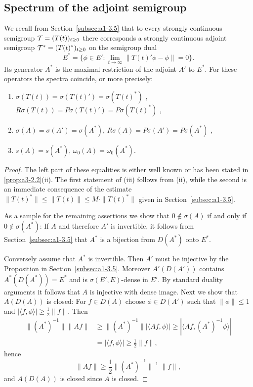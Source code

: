 \subsection{Spectrum of the adjoint semigroup}\label{subsec:a3-4.4}%
We recall from Section~\ref{subsec:a1-3.5} that to every strongly continuous semigroup $\TT = (T(t))_{t \geq 0}$ there corresponds a strongly continuous adjoint semigroup $\TT^{*} = (T(t)^{*})_{t \geq 0}$ on the semigroup dual
\[
E^{*} = \{\phi \in E' \colon \lim_{t \to \infty} \|T(t)'\phi-\phi\| = 0\} .
\]
Its generator $A^{*}$ is the maximal restriction of the adjoint $A'$ to $E^{*}$.
For these operators the spectra coincide, or more precisely:
\begin{enumerate}[\upshape (i)]
\item 
$\sigma(T(t)) = \sigma(T(t)') = \sigma(T(t)^{*})$ , \\
$R\sigma(T(t)) = P\sigma(T(t)') = P\sigma(T(t)^{*})$ , 

\item 
$\sigma(A) = \sigma(A') = \sigma(A^{*})$, $R\sigma(A) = P\sigma(A') = P\sigma(A^{*})$ , 
\item 
$s(A) = s(A^{*})$, $\omega_{0}(A) = \omega_{0}(A^{*})$. 
\end{enumerate}
\begin{proof}
The left part of these equalities is either well known or has been stated in 
\ref{prop:a3-2.2}(ii). %
The first statement of (iii) follows from (ii), while the second is an immediate consequence of the estimate $\|T(t)^{*}\| \leq \|T(t)\| \leq M\cdot\|T(t)^{*}\|$ given in Section~\ref{subsec:a1-3.5}.

As a sample for the remaining assertions we show that $0 \notin \sigma(A)$ if and only if\/ $0 \notin \sigma(A^{*})$:
If\/ $A$ and therefore $A'$ is invertible, it follows from Section~\ref{subsec:a1-3.5} that $A^{*}$ is a bijection from $D(A^{*})$ onto $E^{*}$.

Conversely assume that $A^{*}$ is invertible.
Then $A'$ must be injective by the Proposition in Section~\ref{subsec:a1-3.5}.
Moreover $A'(D(A'))$ contains $A^{*}(D(A^{*})) = E^{*}$ and is $\sigma(E',E)$-dense in $E'$.
By standard duality arguments it follows that $A$ is injective with dense image.
Next we show that $A(D(A))$ is closed: For $f \in D(A)$ choose $\phi \in D(A')$ such that $\|\phi\| \leq 1$ and $|\langle f,\phi \rangle| \geq \frac{1}{2}\|f\|$.
Then
\begin{align*}
\|(A^{*})^{-1}\| \|Af\| &\geq \|(A^{*})^{-1}\| |\langle Af,\phi \rangle| \geq |\langle Af,(A^{*})^{-1}\phi \rangle| \\
&= |\langle f,\phi \rangle| \geq \frac{1}{2}\|f\| ,
\end{align*}
hence
\[
\|Af\| \geq \frac{1}{2}\|(A^{*})^{-1}\|^{-1}\|f\| ,
\]
and $A(D(A))$ is closed since $A$ is closed.
\end{proof}

